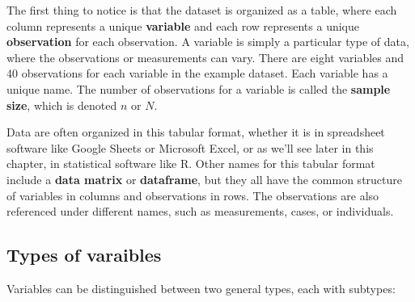\documentclass[
]{book}
\begin{document}
The first thing to notice is that the dataset is organized as a table, where each column represents a unique \textbf{variable} and each row represents a unique \textbf{observation} for each observation. A variable is simply a particular type of data, where the observations or measurements can vary. There are eight variables and 40 observations for each variable in the example dataset. Each variable has a unique name. The number of observations for a variable is called the \textbf{sample size}, which is denoted \(n\) or \(N\).

Data are often organized in this tabular format, whether it is in spreadsheet software like Google Sheets or Microsoft Excel, or as we'll see later in this chapter, in statistical software like R. Other names for this tabular format include a \textbf{data matrix} or \textbf{dataframe}, but they all have the common structure of variables in columns and observations in rows. The observations are also referenced under different names, such as measurements, cases, or individuals.

\subsection{Types of varaibles}\label{types-of-varaibles}

Variables can be distinguished between two general types, each with subtypes:
\end{document}
